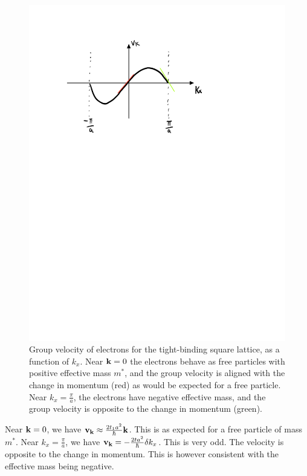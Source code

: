 \begin{figure}[htbp]
    \centering
    \includegraphics[scale=0.6]{Images/fig-squarelatticegroupvelocity.pdf}
    
    \caption{Group velocity of electrons for the tight-binding square lattice, as a function of $k_x$. Near $\mathbf{k} = 0$ the electrons behave as free particles with positive effective mass $m^*$, and the group velocity is aligned with the change in momentum (red) as would be expected for a free particle. Near $k_x = \frac{\pi}{a}$, the electrons have negative effective mass, and the group velocity is opposite to the change in momentum (green).}
    \label{fig-squarelatticegroupvelocity}
\end{figure}

Near $\mathbf{k} = 0$, we have $\mathbf{v}_{\mathbf{k}} \approx \frac{2t_1a^2}{\hbar}\mathbf{k}$. This is as expected for a free particle of mass $m^*$. Near $k_x = \frac{\pi}{a}$, we have $\mathbf{v}_{\mathbf{k}} = -\frac{2ta^2}{\hbar}\delta k_x$. This is very odd. The velocity is opposite to the change in momentum. This is however consistent with the effective mass being negative.

